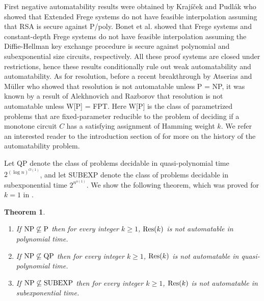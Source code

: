 \documentclass[10pt,a4paper]{article}
\newtheorem{theorem}{Theorem}
\theoremstyle{remark}
\newtheorem*{switching lemma}{Switching Lemma}
\newtheorem*{open problem}{Open Problem}
\theoremstyle{definition}
\begin{document}
First negative automatability results were obtained by Kraj\'{i}\v{c}ek and Pudl\'{a}k \cite{Krajicek-Pudlak1998} who showed that Extended Frege systems  do not have feasible interpolation assuming that RSA is secure against P/poly. Bonet et al. \cite{Bonet-Pitassi-Raz,Bonet-Domingo-Gavalda-Maciel-Pitassi-Raz2004} showed that Frege systems and constant-depth Frege systems do not have feasible interpolation assuming the Diffie-Hellman key exchange procedure is secure against polynomial and subexponential size circuits, respectively. All these proof systems are closed under restrictions, hence these results conditionally rule out weak automatability and automatability. 
As for resolution, before a recent breakthrough by Atserias and M\"uller \cite{atserias-muller2019-focs} who showed that resolution is not automatable unless P = NP, it was known by a result of Alekhnovich and Razborov \cite{Alekhnovich-Razborov2008} that resolution is not automatable unless W[P] = FPT. Here W[P] is the class of parametrized problems that are fixed-parameter reducible to the problem of deciding if a monotone circuit $C$ has a satisfying assignment of Hamming weight $k$. We refer an interested reader to the introduction section of \cite{atserias-muller2019-focs} for more on the history of the automatability problem.

Let QP denote the class of problems decidable in quasi-polynomial time $2^{(\log n)^{O(1)}}$, and let SUBEXP denote the class of problems decidable in subexponential time $2^{n^{o(1)}}$. We show the following theorem, which was proved for $k=1$ in \cite{atserias-muller2019-focs}.


\begin{theorem}
\label{thm:res(k)-not_automatable} 
\begin{enumerate}[1.]
\item If $\textnormal{NP} \not \subseteq \textnormal{P}$ then for every integer $k \geq 1$, $\textnormal{Res}(k)$ is not automatable in polynomial time.
\item If $\textnormal{NP} \not \subseteq \textnormal{QP}$ then for every integer $k \geq 1$, $\textnormal{Res}(k)$ is not automatable in quasi-polynomial time.
\item If $\textnormal{NP} \not \subseteq \textnormal{SUBEXP}$ then for every integer $k \geq 1$, $\textnormal{Res}(k)$ is not automatable in subexponential time.
\end{enumerate}
\end{theorem}
\end{document}
